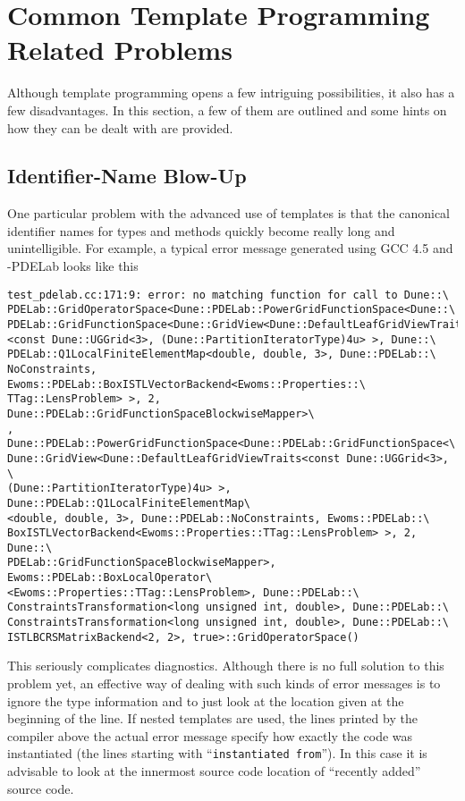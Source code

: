 \section{Common Template Programming Related Problems}

Although \Cplusplus template programming opens a few intriguing
possibilities, it also has a few disadvantages. In this section, a few
of them are outlined and some hints on how they can be dealt with are
provided.

\subsection*{Identifier-Name Blow-Up}

One particular problem with the advanced use of \Cplusplus templates is that the
canonical identifier names for types and methods quickly become really
long and unintelligible. For example, a typical error message
generated using GCC 4.5 and \Dune-PDELab looks like this
\begin{lstlisting}[basicstyle=\ttfamily\scriptsize, numbersep=5pt]
test_pdelab.cc:171:9: error: no matching function for call to Dune::\
PDELab::GridOperatorSpace<Dune::PDELab::PowerGridFunctionSpace<Dune::\
PDELab::GridFunctionSpace<Dune::GridView<Dune::DefaultLeafGridViewTraits\
<const Dune::UGGrid<3>, (Dune::PartitionIteratorType)4u> >, Dune::\
PDELab::Q1LocalFiniteElementMap<double, double, 3>, Dune::PDELab::\
NoConstraints, Ewoms::PDELab::BoxISTLVectorBackend<Ewoms::Properties::\
TTag::LensProblem> >, 2, Dune::PDELab::GridFunctionSpaceBlockwiseMapper>\
, Dune::PDELab::PowerGridFunctionSpace<Dune::PDELab::GridFunctionSpace<\
Dune::GridView<Dune::DefaultLeafGridViewTraits<const Dune::UGGrid<3>, \
(Dune::PartitionIteratorType)4u> >, Dune::PDELab::Q1LocalFiniteElementMap\
<double, double, 3>, Dune::PDELab::NoConstraints, Ewoms::PDELab::\
BoxISTLVectorBackend<Ewoms::Properties::TTag::LensProblem> >, 2, Dune::\
PDELab::GridFunctionSpaceBlockwiseMapper>, Ewoms::PDELab::BoxLocalOperator\
<Ewoms::Properties::TTag::LensProblem>, Dune::PDELab::\
ConstraintsTransformation<long unsigned int, double>, Dune::PDELab::\
ConstraintsTransformation<long unsigned int, double>, Dune::PDELab::\
ISTLBCRSMatrixBackend<2, 2>, true>::GridOperatorSpace()
\end{lstlisting}
This seriously complicates diagnostics. Although there is no full
solution to this problem yet, an effective way of dealing with such
kinds of error messages is to ignore the type information and to just
look at the location given at the beginning of the line. If nested
templates are used, the lines printed by the compiler above the actual
error message specify how exactly the code was instantiated (the lines
starting with ``\texttt{instantiated from}''). In this case it is
advisable to look at the innermost source code location of ``recently
added'' source code.

